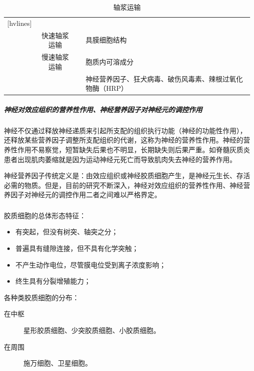 \begin{table}[htbp]
	\centering
	\begin{NiceTabularX}{\textwidth}{cccX}[hvlines]
		 &  &  &  \\
		 & 快速轴浆运输 &  & 具膜细胞结构 \\
		& 慢速轴浆运输 &  & 胞质内可溶成分 \\
		 & &  & 神经营养因子、狂犬病毒、破伤风毒素、辣根过氧化物酶（HRP）
	\end{NiceTabularX}
	\caption{轴浆运输}
	\label{tab:axoplama_trans}
\end{table}

\subparagraph{神经对效应组织的营养性作用、神经营养因子对神经元的调控作用}

神经不仅通过释放神经递质来引起所支配的组织执行功能（神经的功能性作用），还释放某些营养因子调整所支配组织的代谢，这称为神经的营养性作用。神经的营养性作用不易察觉，短暂缺失后果也不明显，长期缺失则后果严重。如脊髓灰质炎患者出现肌肉萎缩就是因为运动神经元死亡而导致肌肉失去神经的营养作用。

神经营养因子传统定义是：由效应组织或神经胶质细胞产生，是神经元生长、存活必需的物质。但是，目前的研究不断深入，神经对效应组织的营养性作用、神经营养因子对神经元的调控作用二者之间难以严格界定。

\subsubsection{}

胶质细胞的总体形态特征：
\begin{itemize}
	\item 有突起，但没有树突、轴突之分；
	\item 普遍具有缝隙连接，但不具有化学突触；
	\item 不产生动作电位，尽管膜电位受到离子浓度影响；
	\item 终生具有分裂增殖能力；
\end{itemize}

各种类胶质细胞的分布：
\begin{description}
	\item[在中枢] 星形胶质细胞、少突胶质细胞、小胶质细胞。
	\item[在周围] 施万细胞、卫星细胞。
\end{description}

